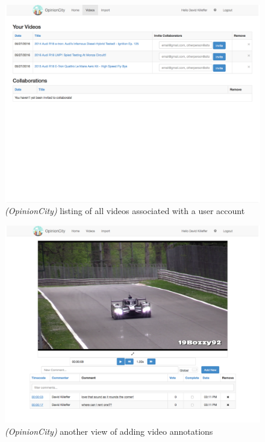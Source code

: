 \begin{figure}[!ht]
	\includegraphics[width=\textwidth]{gfx/opinion-city/videolist2.pdf}
	\caption{\textit{(OpinionCity)} listing of all videos associated with a user account} 
	\label{fig:opinioncity:video-listing}
\end{figure}

\begin{figure}[!ht]
	\includegraphics[width=\textwidth]{gfx/opinion-city/car3.pdf}
	\caption{\textit{(OpinionCity)} another view of adding video annotations} 
	\label{fig:opinioncity:adding-video-annotations-view2}
\end{figure}


